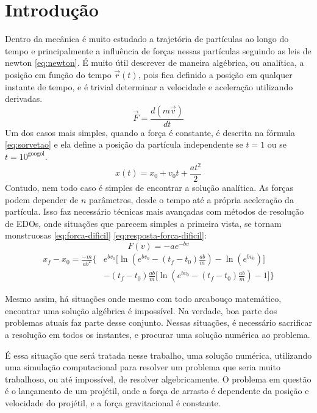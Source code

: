\section{Introdução}
\label{sec:introducao}

Dentro da mecânica é muito estudado a trajetória de partículas ao longo do tempo e principalmente a influência de forças nessas partículas seguindo as leis de newton \ref{eq:newton}. É muito útil descrever de maneira algébrica, ou analítica, a posição em função do tempo $\vec r(t)$, pois fica definido a posição em qualquer instante de tempo, e é trivial determinar a velocidade e aceleração utilizando derivadas.
\begin{equation}
    \label{eq:newton}
    \vec F = \frac{d(m\vec v)}{dt}
\end{equation}
Um dos casos mais simples, quando a força é constante, é descrita na fórmula \ref{eq:sorvetao} e ela define a posição da partícula independente se $t = 1$ ou se $t = 10^{\text{googol}}$.
\begin{equation}
    \label{eq:sorvetao}
    x(t) = x_0 + v_0t + \frac{at^2}{2}
\end{equation}
Contudo, nem todo caso é simples de encontrar a solução analítica. As forças podem depender de $n$ parâmetros, desde o tempo até a própria aceleração da partícula. Isso faz necessário técnicas mais avançadas com métodos de resolução de EDOs, onde situações que parecem simples a primeira vista, se tornam monstruosas \ref{eq:forca-dificil} \ref{eq:resposta-forca-dificil}:
\begin{equation}
    \label{eq:forca-dificil}
    F(v) = -ae^{-bv}
\end{equation}
\begin{equation}
    \label{eq:resposta-forca-dificil}
\begin{aligned}
x_f - x_0 = \frac{-m}{ab^2} \Bigg\{
& e^{b v_0} \Bigg[
    \ln\left(e^{b v_0} - (t_f - t_0)\frac{ab}{m}\right)
    - \ln\left(e^{b v_0}\right)
\Bigg] \\
& - (t_f - t_0)\frac{ab}{m} \Bigg[
    \ln\left(e^{b v_0} - (t_f - t_0)\frac{ab}{m}\right)
    - 1
\Bigg]
\Bigg\}
\end{aligned}
\end{equation}

Mesmo assim, há situações onde mesmo com todo arcabouço matemático, encontrar uma solução algébrica é impossível. Na verdade, boa parte dos problemas atuais faz parte desse conjunto. Nessas situações, é necessário sacrificar a resolução em todos os instantes, e procurar uma solução numérica ao problema.

É essa situação que será tratada nesse trabalho, uma solução numérica, utilizando uma simulação computacional para resolver um problema que seria muito trabalhoso, ou até impossível, de resolver algebricamente. O problema em questão é o lançamento de um projétil, onde a força de arrasto é dependente da posição e velocidade do projétil, e a força gravitacional é constante.
